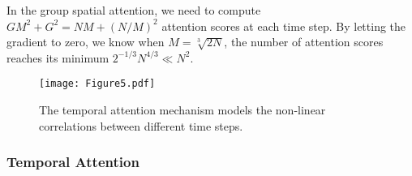 \documentclass[letterpaper]{article} \usepackage{aaai20}  \usepackage{times}  \usepackage{helvet} \usepackage{courier}  \usepackage[hyphens]{url}  \usepackage{graphicx} \usepackage{amsmath}
\begin{document}
In the group spatial attention, we need to compute $ GM^2+G^2=NM+(N/M)^2 $ attention scores at each time step. By letting the gradient to zero, we know when $ M=\sqrt[3]{2N} $, the number of attention scores reaches its minimum $ 2^{-1/3}N^{4/3} \ll N^2 $.

\begin{figure}
	\centering
	\texttt{[image: Figure5.pdf]} \\
	\caption{The temporal attention mechanism models the non-linear correlations between different time steps.}
	\label{Figure5}
\end{figure}

\subsubsection{Temporal Attention}
\end{document}
